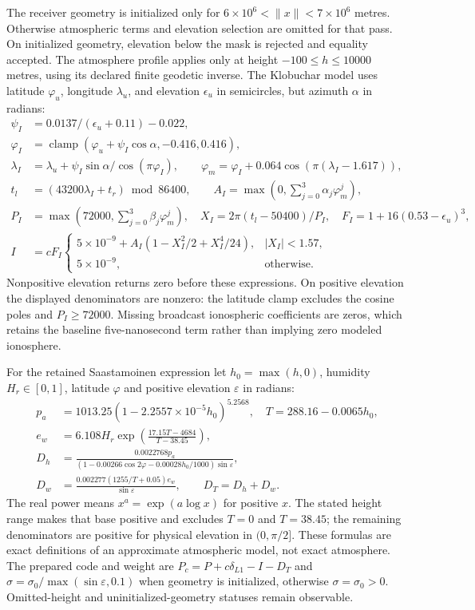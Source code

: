 The receiver geometry is initialized only for $6\times10^6<\|x\|<7\times10^6$
metres. Otherwise atmospheric terms and elevation selection are omitted for
that pass. On initialized geometry, elevation below the mask is rejected and
equality accepted. The atmosphere profile applies only at height
$-100\le h\le10000$ metres, using its declared finite geodetic inverse.
The Klobuchar model uses latitude $\varphi_u$, longitude $\lambda_u$, and
elevation $\epsilon_u$ in semicircles, but azimuth $\alpha$ in radians:
\begin{align}
 \psi_I&=0.0137/(\epsilon_u+0.11)-0.022,\\
 \varphi_I&=\operatorname{clamp}(\varphi_u+\psi_I\cos\alpha,-0.416,0.416),\\
 \lambda_I&=\lambda_u+\psi_I\sin\alpha/\cos(\pi\varphi_I),\qquad
 \varphi_m=\varphi_I+0.064\cos(\pi(\lambda_I-1.617)),\\
 t_l&=(43200\lambda_I+t_r)\bmod86400,\qquad
 A_I=\max(0,\sum_{j=0}^3\alpha_j\varphi_m^j),\\
 P_I&=\max(72000,\sum_{j=0}^3\beta_j\varphi_m^j),\quad
 X_I=2\pi(t_l-50400)/P_I,\quad F_I=1+16(0.53-\epsilon_u)^3,\\
 I&=cF_I\begin{cases}
 5\times10^{-9}+A_I(1-X_I^2/2+X_I^4/24),&|X_I|<1.57,\\
 5\times10^{-9},&\text{otherwise}.
 \end{cases}
\end{align}
Nonpositive elevation returns zero before these expressions. On positive
elevation the displayed denominators are nonzero: the latitude clamp excludes
the cosine poles and $P_I\ge72000$. Missing broadcast ionospheric coefficients
are zeros, which retains the baseline five-nanosecond term rather than implying
zero modeled ionosphere.

For the retained Saastamoinen expression let $h_0=\max(h,0)$, humidity
$H_r\in[0,1]$, latitude $\varphi$ and positive elevation $\varepsilon$ in radians:
\begin{align}
 p_a&=1013.25(1-2.2557\times10^{-5}h_0)^{5.2568},\quad
 T=288.16-0.0065h_0,\\
 e_w&=6.108H_r\exp\left(\frac{17.15T-4684}{T-38.45}\right),\\
 D_h&=\frac{0.0022768p_a}
 {(1-0.00266\cos2\varphi-0.00028h_0/1000)\sin\varepsilon},\\
 D_w&=\frac{0.002277(1255/T+0.05)e_w}{\sin\varepsilon},\qquad D_T=D_h+D_w.
\end{align}
The real power means $x^a=\exp(a\log x)$ for positive $x$. The stated height
range makes that base positive and excludes $T=0$ and $T=38.45$; the remaining
denominators are positive for physical elevation in $(0,\pi/2]$. These formulas
are exact definitions of an approximate atmospheric model, not exact atmosphere.
The prepared code and weight are
$P_c=P+c\delta_{L1}-I-D_T$ and
$\sigma=\sigma_0/\max(\sin\varepsilon,0.1)$ when geometry is initialized,
otherwise $\sigma=\sigma_0>0$. Omitted-height and uninitialized-geometry statuses
remain observable.

